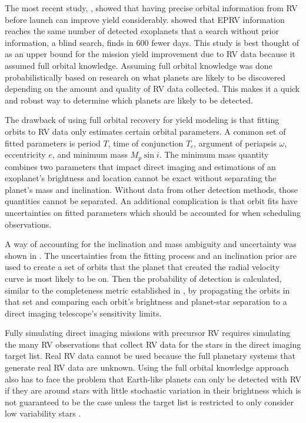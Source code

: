The most recent study, \citet{morganExplorationExpectedNumber2022a}, showed
that having precise orbital information from RV before launch can improve yield
considerably. \citet{morganExplorationExpectedNumber2022a} showed that EPRV
information reaches the same number of detected exoplanets that a search
without prior information, a blind search, finds in 600 fewer days. This study
is best thought of as an upper bound for the mission yield improvement due to
RV data because it assumed full orbital knowledge. Assuming full orbital
knowledge was done probabilistically based on research on what planets are
likely to be discovered depending on the amount and quality of RV data
collected. This makes it a quick and robust way to determine which planets are
likely to be detected.

The drawback of using full orbital recovery for yield modeling is that fitting
orbits to RV data only estimates certain orbital parameters. A common set of
fitted parameters is period $T$, time of conjunction $T_c$, argument of
periapsis $\omega$, eccentricity $e$, and minimum mass $M_p \sin{i}$. The
minimum mass quantity combines two parameters that impact direct imaging and
estimations of an exoplanet's brightness and location cannot be exact without
separating the planet's mass and inclination. Without data from other detection
methods, those quantities cannot be separated. An additional complication is
that orbit fits have uncertainties on fitted parameters which should be
accounted for when scheduling observations.

A way of accounting for the inclination and mass ambiguity and uncertainty was
shown in . The uncertainties from the fitting
process and an inclination prior are used to create a set of orbits that the
planet that created the radial velocity curve is most likely to be on. Then the
probability of detection is calculated, similar to the completeness metric
established in \citet{Brown2005d}, by propagating the orbits in that set and
comparing each orbit's brightness and planet-star separation to a direct
imaging telescope's sensitivity limits.

Fully simulating direct imaging missions with precursor RV requires simulating
the many RV observations that collect RV data for the stars in the direct
imaging target list. Real RV data cannot be used because the full planetary
systems that generate real RV data are unknown. Using the full orbital
knowledge approach also has to face the problem that Earth-like planets can
only be detected with RV if they are around stars with little stochastic
variation in their brightness which is not guaranteed to be the case unless the
target list is restricted to only consider low variability stars
\citep{Crass2021}.

